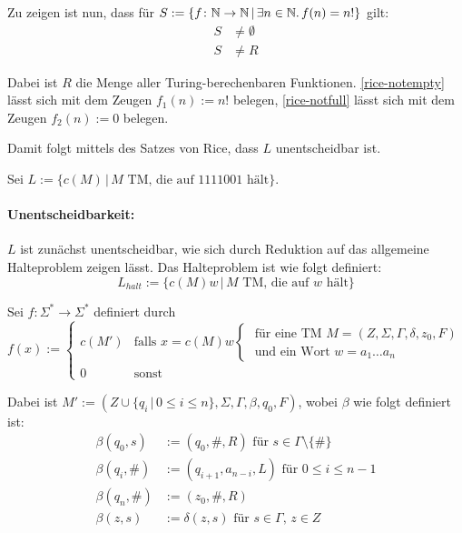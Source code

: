 \begin{example}
	Zu zeigen ist nun, dass für $S := \{f \colon \mathbb{N} \rightarrow \mathbb{N} \,|\, 
	\exists n \in \mathbb{N}.\, f(n) = n! \}$ gilt:
	\begin{align}
		S & \neq \emptyset \label{rice-notempty}\tag{Not Empty} \\
		S & \neq R \label{rice-notfull}\tag{Not Full}
	\end{align}

	Dabei ist $R$ die Menge aller Turing-berechenbaren Funktionen.
	\eqref{rice-notempty} lässt sich mit dem Zeugen $f_1 (n) := n!$ belegen,
	\eqref{rice-notfull} lässt sich mit dem Zeugen $f_2 (n) := 0$ belegen.

	Damit folgt mittels des Satzes von Rice, dass $L$ unentscheidbar ist.
\end{example}

\begin{example}
	Sei $L := \{ c(M) \,|\, M \text{ TM, die auf } 1111001 \text{ hält} \}$.

	\paragraph{Unentscheidbarkeit:}
	$L$ ist zunächst unentscheidbar, wie sich durch Reduktion auf
	das allgemeine Halteproblem zeigen lässt. Das Halteproblem ist wie folgt
	definiert:
	\begin{equation}
		L_{halt} := \{ c(M)w \,|\, M \text{ TM, die auf } w \text{ hält}
		\}
	\end{equation}

	Sei $f \colon \Sigma^* \rightarrow \Sigma^*$ definiert durch
	\begin{equation}
		f(x) :=
		\begin{cases}
			c(M') 
			& \text{falls } x = c(M)w 
			\begin{cases}
				\text{ für eine TM } M = (Z,\Sigma,\Gamma,\delta,z_0,F) \\
				\text{ und ein Wort } w = a_1 \ldots a_n 
			\end{cases} \\
			0 & \text{sonst}
		\end{cases}
	\end{equation}

	Dabei ist $M' := (Z \cup \{q_i \,|\, 0 \leq i \leq n
	\},\Sigma,\Gamma,\beta,q_0,F)$, wobei $\beta$ wie folgt definiert ist:
	\begin{align*}
		\beta(q_0,s) & := (q_0,\#,R) \text{ für } s \in \Gamma \setminus
		\{\#\} \\
		\beta(q_i,\#) & := (q_{i+1},a_{n - i},L) \text{ für } 0 \leq i \leq n
		- 1 \\
		\beta(q_n,\#) & := (z_0,\#,R) \\
		\beta(z,s) & := \delta(z,s) \text{ für } s \in \Gamma \text{, }
		z \in Z
	\end{align*}


\end{example}
